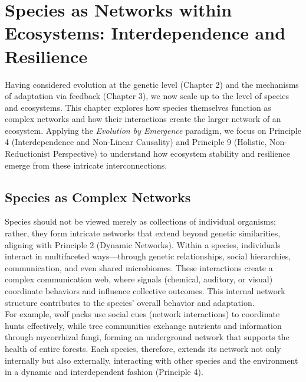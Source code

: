\chapter{Species as Networks within Ecosystems: Interdependence and Resilience} %
\label{ch:SpeciesNetworks}

Having considered evolution at the genetic level (Chapter 2) and the mechanisms of adaptation via feedback (Chapter 3), we now scale up to the level of species and ecosystems. This chapter explores how species themselves function as complex networks and how their interactions create the larger network of an ecosystem. Applying the \emph{Evolution by Emergence} paradigm, we focus on Principle 4 (Interdependence and Non-Linear Causality) and Principle 9 (Holistic, Non-Reductionist Perspective) to understand how ecosystem stability and resilience emerge from these intricate interconnections. %

\section{Species as Complex Networks}
Species should not be viewed merely as collections of individual organisms; rather, they form intricate networks that extend beyond genetic similarities, aligning with Principle 2 (Dynamic Networks). Within a species, individuals interact in multifaceted ways—through genetic relationships, social hierarchies, communication, and even shared microbiomes. These interactions create a complex communication web, where signals (chemical, auditory, or visual) coordinate behaviors and influence collective outcomes. This internal network structure contributes to the species' overall behavior and adaptation.\\[1ex] %
For example, wolf packs use social cues (network interactions) to coordinate hunts effectively, while tree communities exchange nutrients and information through mycorrhizal fungi, forming an underground network that supports the health of entire forests. Each species, therefore, extends its network not only internally but also externally, interacting with other species and the environment in a dynamic and interdependent fashion (Principle 4).

